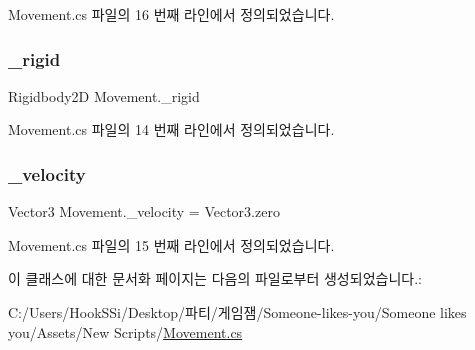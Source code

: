 Movement.\+cs 파일의 16 번째 라인에서 정의되었습니다.

\mbox{\label{class_movement_a8b24a93b5f529e53c668ff81bde13c0d}} 
\subsubsection{\texorpdfstring{\_rigid}{\_rigid}}
{\footnotesize\ttfamily Rigidbody2D Movement.\+\_\+rigid\hspace{0.3cm}{\ttfamily [protected]}}



Movement.\+cs 파일의 14 번째 라인에서 정의되었습니다.

\mbox{\label{class_movement_a6ea6768262f1dca968be8ee5c14a0cc1}} 
\subsubsection{\texorpdfstring{\_velocity}{\_velocity}}
{\footnotesize\ttfamily Vector3 Movement.\+\_\+velocity = Vector3.\+zero\hspace{0.3cm}{\ttfamily [protected]}}



Movement.\+cs 파일의 15 번째 라인에서 정의되었습니다.



이 클래스에 대한 문서화 페이지는 다음의 파일로부터 생성되었습니다.\+:\begin{DoxyCompactItemize}
\item 
C\+:/\+Users/\+Hook\+S\+Si/\+Desktop/파티/게임잼/\+Someone-\/likes-\/you/\+Someone likes you/\+Assets/\+New Scripts/\mbox{\hyperlink{_movement_8cs}{Movement.\+cs}}\end{DoxyCompactItemize}
